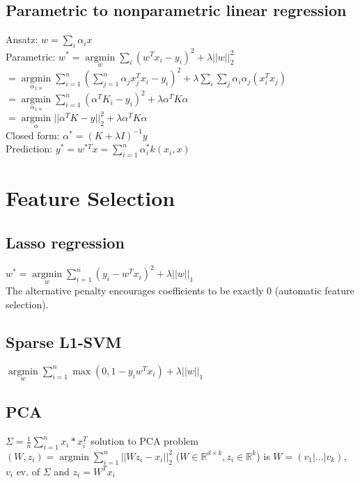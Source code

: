 \subsection*{Parametric to nonparametric linear regression}
Ansatz: $w=\sum_i \alpha_i x$\\
Parametric: $w^* = \underset{w}{\operatorname{argmin}} \sum_i (w^Tx_i-y_i)^2 + \lambda ||w||_2^2$\\
$= \underset{\alpha_{1:n}}{\operatorname{argmin}} \sum \limits_{i=1}^n (\sum \limits_{j=1}^n \alpha_j x_j^T x_i - y_i)^2 + \lambda \sum \limits_i \sum \limits_j \alpha_i \alpha_j (x_i^T x_j)$\\
$= \underset{\alpha_{1:n}}{\operatorname{argmin}} \sum \limits_{i=1}^n (\alpha^T K_i - y_i)^2 + \lambda \alpha^T K \alpha$\\
$= \underset{\alpha}{\operatorname{argmin}} ||\alpha^T K -y||_2^2 + \lambda \alpha^T K \alpha$\\
Closed form: $\alpha^* = (K+\lambda I)^{-1} y$\\
Prediction: $y^*= w^{*T} x = \sum \limits_{i=1}^n \alpha_i^* k(x_i,x)$

\section*{Feature Selection}
\subsection*{Lasso regression}
$w^* = \underset{w}{\operatorname{argmin}} \sum \limits_{i=1}^n (y_i - w^Tx_i)^2 + \lambda ||w||_1$\\
The alternative penalty encourages coefficients to be exactly 0 (automatic feature selection).

\subsection*{Sparse L1-SVM}
$\underset{w}{\operatorname{argmin}} \sum \limits_{i=1}^n \max (0, 1-y_i w^T x_i) + \lambda ||w||_1$

\subsection*{PCA}
$\Sigma = \frac{1}{n}\sum_{i=1}^n x_i*x_i^T$
solution to PCA problem $(W,z_i)=\operatorname{argmin}\sum_{i=1}^n ||Wz_i-x_i||_2^2$ ($W\in \mathbb{R}^{d \times k}, z_i\in \mathbb{R}^k$) is $W = (v_1|...|v_k)$, $v_i$ ev. of $\Sigma$ and $z_i = W^Tx_i$